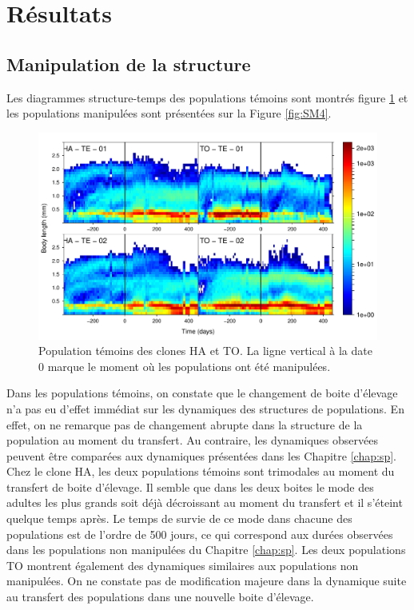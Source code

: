 \section{Résultats}

\subsection{Manipulation de la structure}

Les diagrammes structure-temps des populations témoins sont montrés figure
\ref{fig:SM3} et les populations manipulées sont présentées sur la Figure
\ref{fig:SM4}.

\begin{figure}[!ht]
\begin{center}
\includegraphics[width=1\textwidth]{1_CorpsDeThese/Resumes/Fig/SM04}
\caption[Population
témoins des clones HA et TO]{Population
témoins des clones HA et TO. La ligne vertical à la date 0 marque le moment où
les populations ont été manipulées.}
\label{fig:SM3}
\end{center}
\end{figure}

Dans les populations témoins, on constate que le changement de boite d'élevage
n'a pas eu d'effet immédiat sur les dynamiques des structures de populations. En
effet, on ne remarque pas de changement abrupte dans la structure de la
population au moment du transfert. Au contraire, les dynamiques observées
peuvent être comparées aux dynamiques présentées dans les Chapitre
\ref{chap:sp}. Chez le clone HA, les deux populations témoins sont trimodales au
moment du transfert de boite d'élevage. Il semble que dans les deux boites le
mode des adultes les plus grands soit déjà décroissant au moment du transfert et
il s'éteint quelque temps après. Le temps de survie de ce mode dans chacune des
populations est de l'ordre de 500 jours, ce qui correspond aux durées observées
dans les populations non manipulées du Chapitre \ref{chap:sp}. Les deux
populations TO montrent également des dynamiques similaires aux populations non
manipulées. On ne constate pas de modification majeure dans la dynamique suite
au transfert des populations dans une nouvelle boite d'élevage. 


